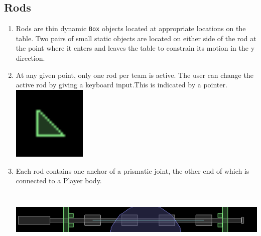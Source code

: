\documentclass{article}
\begin{document}
\subsection{Rods}
\begin{enumerate}
\item Rods are thin dynamic \texttt{Box} objects located at appropriate locations on the table. Two pairs of small static objects are located on either side of the rod at the point where it enters and leaves the table to constrain its motion in the y direction.\\

\item At any given point, only one rod per team is active. The user can change the active rod by giving a keyboard input.This is indicated by a pointer.\\
\includegraphics[width=100pt,height=100pt]{Pointer}

\item Each rod contains one anchor of a prismatic joint, the other end of which is connected to a Player body.\\
\includegraphics[width=500pt,height=100pt]{Rod}
\end{enumerate}
\end{document}
